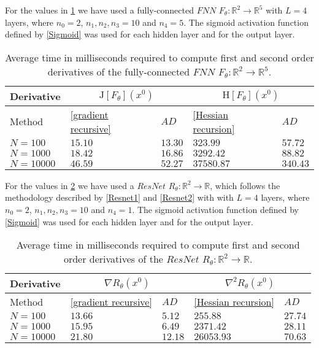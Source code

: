 For the values in \cref{tab:advs ecplicit: FNN} we have used a fully-connected $FNN$ $F_{\theta} \colon \mathbb{R}^2 \to \mathbb{R}^5$ with $L = 4$ layers, where $n_0 = 2$, $n_1, n_2, n_3 = 10$ and $n_4 = 5$. The sigmoid activation function defined by \cref{Sigmoid} was used for each hidden layer and for the output layer. 
\begin{table}[H]
    \resizebox{\textwidth}{!}
    {
        \begin{tabular}{l l l l l }
            \toprule
            Derivative & \multicolumn{2}{c}{$\mathrm{J} \left[ F_{\theta} \right]\left(x^0\right)$}& \multicolumn{2}{c}{$\mathrm{H} \left[F_{\theta} \right]\left(x^0\right)$} \\ 
            \midrule
            Method & \cref{gradient recursive} & $AD$ & \cref{Hessian recursion} & $AD$ \\ 
            \midrule
            $N = 100$ & $15.10$ & $13.30$ & $323.99$ & $57.72$ \\ 
            \midrule
            $N = 1000$ & $18.42$ & $16.86$ & $3292.42$ & $88.82$ \\ 
            \midrule
            $N = 10000$ & $46.59$ & $52.27$ & $37580.87$ & $340.43$ \\ 
            \bottomrule
        \end{tabular}
    }
    \caption{Average time in milliseconds required to compute first and second order derivatives of the fully-connected $FNN$ $F_{\theta} \colon \mathbb{R}^2 \to \mathbb{R}^5$.}
    \label{tab:advs ecplicit: FNN}
\end{table}
For the values in \cref{tab:advs ecplicit: ResNet} we have used a $ResNet$ $R_{\theta} \colon \mathbb{R}^2 \to \mathbb{R}$, which follows the methodology described by \cref{Resnet1} and \cref{Resnet2} with with $L = 4$ layers, where $n_0 = 2$, $n_1, n_2, n_3 = 10$ and $n_4 = 1$. The sigmoid activation function defined by \cref{Sigmoid} was used for each hidden layer and for the output layer. 
\begin{table}[H]
    \resizebox{\textwidth}{!}
    {
        \begin{tabular}{l l l l l }
            \toprule
            Derivative & \multicolumn{2}{c}{$\nabla R_{\theta} \left(x^0 \right)$}& \multicolumn{2}{c}{$\nabla^2 R_{\theta} \left(x^0 \right)$} \\ 
            \midrule
            Method & \cref{gradient recursive} & $AD$ & \cref{Hessian recursion} & $AD$ \\ 
            \midrule
            $N = 100$ & $13.66$ & $5.12$ & $255.88$ & $27.74$ \\ 
            \midrule
            $N = 1000$ & $15.95$ & $6.49$ & $2371.42$ & $28.11$ \\ 
            \midrule
            $N = 10000$ & $21.80$ & $12.18$ & $26053.93$ & $70.63$ \\ 
            \bottomrule
        \end{tabular}
    }
    \caption{Average time in milliseconds required to compute first and second order derivatives of the $ResNet$ $R_{\theta} \colon \mathbb{R}^2 \to \mathbb{R}$.}
    \label{tab:advs ecplicit: ResNet}
\end{table}

